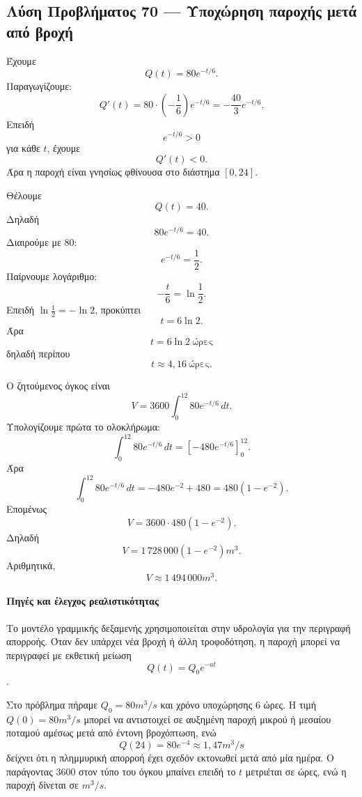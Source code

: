 \subsection*{Λύση Προβλήματος 70 --- Υποχώρηση παροχής μετά από βροχή}

\begin{alist}
  \item Έχουμε
        \[
          Q(t)=80e^{-t/6}.
        \]
        Παραγωγίζουμε:
        \[
          Q'(t)=80\cdot\left(-\frac{1}{6}\right)e^{-t/6}
          =
          -\frac{40}{3}e^{-t/6}.
        \]
        Επειδή
        \[
          e^{-t/6}>0
        \]
        για κάθε \(t\), έχουμε
        \[
          Q'(t)<0.
        \]
        Άρα η παροχή είναι γνησίως φθίνουσα στο διάστημα \([0,24]\).

  \item Θέλουμε
        \[
          Q(t)=40.
        \]
        Δηλαδή
        \[
          80e^{-t/6}=40.
        \]
        Διαιρούμε με \(80\):
        \[
          e^{-t/6}=\frac{1}{2}.
        \]
        Παίρνουμε λογάριθμο:
        \[
          -\frac{t}{6}=\ln\frac{1}{2}.
        \]
        Επειδή \(\ln\frac{1}{2}=-\ln2\), προκύπτει
        \[
          t=6\ln2.
        \]
        Άρα
        \[
          {t=6\ln2\ \text{ώρες}}
        \]
        δηλαδή περίπου
        \[
          {t\approx4{,}16\ \text{ώρες}}.
        \]

  \item Ο ζητούμενος όγκος είναι
        \[
          V=3600\int_0^{12}80e^{-t/6}\,dt.
        \]
        Υπολογίζουμε πρώτα το ολοκλήρωμα:
        \[
          \int_0^{12}80e^{-t/6}\,dt
          =
          \left[-480e^{-t/6}\right]_0^{12}.
        \]
        Άρα
        \[
          \int_0^{12}80e^{-t/6}\,dt
          =
          -480e^{-2}+480
          =
          480(1-e^{-2}).
        \]
        Επομένως
        \[
          V=3600\cdot480(1-e^{-2}).
        \]
        Δηλαδή
        \[
          {V=1\,728\,000(1-e^{-2})\si{m^3}}.
        \]
        Αριθμητικά,
        \[
          {V\approx1\,494\,000\si{m^3}}.
        \]
\end{alist}

\paragraph{Πηγές και έλεγχος ρεαλιστικότητας}
Το μοντέλο γραμμικής δεξαμενής χρησιμοποιείται στην υδρολογία για την
περιγραφή απορροής. Όταν δεν υπάρχει νέα βροχή ή άλλη τροφοδότηση, η
παροχή μπορεί να περιγραφεί με εκθετική μείωση
\[
  Q(t)=Q_0e^{-at}
\]
\cite{linearReservoirRunoffModel}.

Στο πρόβλημα πήραμε \(Q_0=80\si{m^3/s}\) και χρόνο υποχώρησης
\(6\) ώρες. Η τιμή \(Q(0)=80\si{m^3/s}\) μπορεί να αντιστοιχεί σε
αυξημένη παροχή μικρού ή μεσαίου ποταμού αμέσως μετά από έντονη
βροχόπτωση, ενώ
\[
  Q(24)=80e^{-4}\approx1{,}47\si{m^3/s}
\]
δείχνει ότι η πλημμυρική απορροή έχει σχεδόν εκτονωθεί μετά από μία
ημέρα. Ο παράγοντας \(3600\) στον τύπο του όγκου μπαίνει επειδή το
\(t\) μετριέται σε ώρες, ενώ η παροχή δίνεται σε
\(\si{m^3/s}\).
